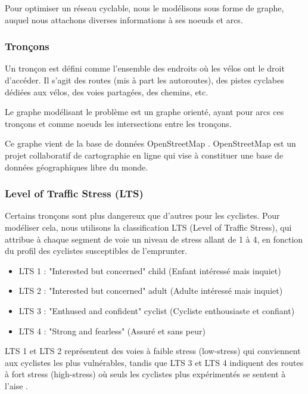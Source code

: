Pour optimiser un réseau cyclable, nous le modélisons sous forme de graphe, auquel nous attachons diverses informations à ses noeuds et arcs.

\subsubsection{Tronçons}\label{sect:troncons}

Un tronçon est défini comme l'ensemble des endroits où les vélos ont le droit d'accéder. Il s'agit des routes (mis à part les autoroutes), des pistes cyclabes dédiées aux vélos, des voies partagées, des chemins, etc. 

Le graphe modélisant le problème est un graphe orienté, ayant pour arcs ces tronçons et comme noeuds les intersections entre les tronçons.

Ce graphe vient de la base de données OpenStreetMap \cite{OSM}. OpenStreetMap est un projet collaboratif de cartographie en ligne qui vise à constituer une base de données géographiques libre du monde. 

\subsubsection{Level of Traffic Stress (LTS)}\label{sect:lts}

Certains tronçons sont plus dangereux que d'autres pour les cyclistes. Pour modéliser cela, nous utilisons la classification LTS (Level of Traffic Stress), qui attribue à chaque segment de voie un
niveau de stress allant de 1 à 4, en fonction du profil des cyclistes susceptibles de l'emprunter.

\begin{itemize}
    \item LTS 1 : "Interested but concerned" child (Enfant intéressé mais inquiet)
    \item LTS 2 : "Interested but concerned" adult (Adulte intéressé mais inquiet)
    \item LTS 3 : "Enthused and confident" cyclist (Cycliste enthousiaste et confiant)
    \item LTS 4 : "Strong and fearless" (Assuré et sans peur)
\end{itemize}

LTS 1 et LTS 2 représentent des voies à faible stress (low-stress) qui conviennent aux cyclistes les plus vulnérables, tandis que LTS 3 et LTS 4 indiquent des routes à fort stress (high-stress) où seuls les cyclistes plus expérimentés se sentent à l'aise \cite{kent_karner}.

